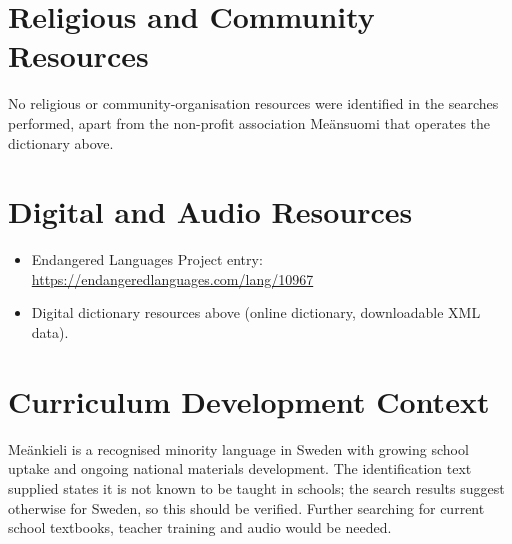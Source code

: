 \documentclass[12pt]{article}
\begin{document}
\section{Religious and Community Resources}
No religious or community-organisation resources were identified in the searches performed, apart from the non-profit association Me\"ansuomi that operates the dictionary above.

\section{Digital and Audio Resources}
\begin{itemize}
\item Endangered Languages Project entry: \url{https://endangeredlanguages.com/lang/10967}
\item Digital dictionary resources above (online dictionary, downloadable XML data).
\end{itemize}

\section{Curriculum Development Context}
Me\"ankieli is a recognised minority language in Sweden with growing school uptake and ongoing national materials development. The identification text supplied states it is not known to be taught in schools; the search results suggest otherwise for Sweden, so this should be verified. Further searching for current school textbooks, teacher training and audio would be needed.
\end{document}

